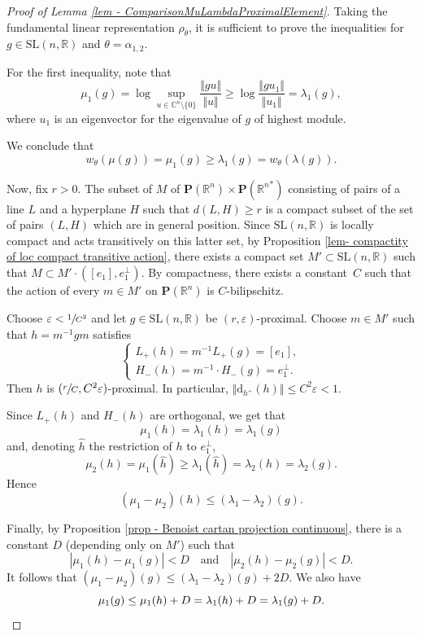 \documentclass[11pt]{article}
\numberwithin{equation}{section}
\newcommand{\quand}{\quad\text{and}\quad}
\theoremstyle{definition}
\newcommand{\proj}{\mathbf{P}}
\newcommand{\R}{\mathbb{R}}
\newcommand{\C}{\mathbb{C}}
\newcommand{\SL}{\mathrm{SL}}
\let\epsilon\varepsilon
\begin{document}
\begin{proof}[Proof of Lemma \ref{lem - ComparisonMuLambdaProximalElement}]
Taking the fundamental linear representation $\rho_\theta$, it is sufficient to prove the inequalities for $g\in \SL(n,\R)$ and $\theta = \alpha_{1,2}$.

For the first inequality, note that
\[
\mu_1(g) = \log \sup_{u\in \C^n\setminus \{0\}} \frac{\Vert g u \Vert}{\Vert u \Vert} \geq \log \frac{\Vert g u_1 \Vert}{\Vert u_1 \Vert} = \lambda_1(g),
\]
where $u_1$ is an eigenvector for the eigenvalue of $g$ of highest module.

We conclude that
\[
w_\theta(\mu(g)) = \mu_1(g) \geq \lambda_1(g) = w_\theta(\lambda(g)).
\]

Now, fix $r>0$. The subset of $M$ of $\proj(\R^n)\times \proj({\R^n}^*)$ consisting of pairs of a line $L$ and a hyperplane $H$ such that $d(L , H) \geq r$ is a compact subset of the set of pairs $(L,H)$ which are in general position. Since $\SL(n, \R) $ is locally compact and acts transitively on this latter set, by Proposition \ref{lem- compactity of loc compact transitive action}, there exists a compact set $M'\subset \SL(n,\R)$ such that $M \subset M'\cdot ([e_1], e_1^\perp)$. By compactness, there exists a constant~$C$ such that the action of every $m\in M'$ on $\proj(\R^n)$ is $C$-bilipschitz.

Choose $\epsilon < \sfrac{1}{C^2}$ and let $g\in \SL(n,\R)$ be $(r,\epsilon)$-proximal. Choose $m\in M'$ such that $h=m^{-1}gm$ satisfies
\[\begin{cases}
L_+(h) = m^{-1} L_+(g) = [e_1],\\
H_-(h) = m^{-1} \cdot H_-(g) = e_1^\perp.
\end{cases}
\]
Then $h$ is $(\sfrac{r}{C}, C^2 \epsilon)$-proximal. In particular,
$\Vert \mathrm d_{h^+}(h) \Vert \leq C^2 \epsilon < 1$.

Since $L_+(h)$ and $H_-(h)$ are orthogonal, we get that \[\mu_1 (h)= \lambda_1(h) = \lambda_1(g)\] and, denoting $\hat h$ the restriction of $h$ to $e_1^\perp$,
\[\mu_2(h) = \mu_1(\hat h) \geq \lambda_1(\hat h) = \lambda_2(h) = \lambda_2(g).\]
Hence
\[(\mu_1-\mu_2)(h) \leq (\lambda_1-\lambda_2)(g).\]

Finally, by Proposition \ref{prop - Benoist cartan projection continuous}, there is a constant $D$ (depending only on $M'$) such that
\[|\mu_1(h) - \mu_1(g)| < D\quand
|\mu_2(h) - \mu_2(g)| < D.\]
It follows that $(\mu_1-\mu_2)(g)\leq (\lambda_1-\lambda_2)(g)+2D$. We also have \[\mu_1(g) \leq \mu_1(h)+D=\lambda_1(h)+D=\lambda_1(g)+D.\qedhere\]
\end{proof}
\end{document}

